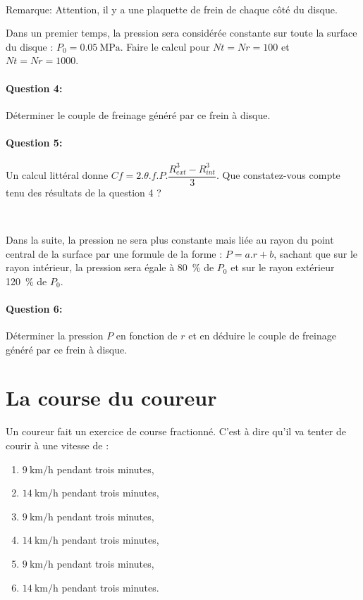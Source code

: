 ~\

Remarque: Attention, il y a une plaquette de frein de chaque côté du disque.

Dans un premier temps, la pression sera considérée constante sur toute la surface du disque : $P_0=\SI{0,05}{\mega\pascal}$. Faire le calcul pour $Nt=Nr=100$ et $Nt=Nr=1000$.

\paragraph{Question 4:} Déterminer le couple de freinage généré par ce frein à disque.

\paragraph{Question 5:} Un calcul littéral donne $Cf=2.\theta.f.P.\dfrac{R_{ext}^3-R_{int}^3}{3}$. Que constatez-vous compte tenu des résultats de la question 4 ?

~\

Dans la suite, la pression ne sera plus constante mais liée au rayon du point central de la surface par une formule de la forme : $P=a.r+b$, sachant que sur le rayon intérieur, la pression sera égale à \SI{80}{\percent} de $P_0$ et sur le rayon extérieur \SI{120}{\percent} de $P_0$.

\paragraph{Question 6:} Déterminer la pression $P$ en fonction de $r$ et en déduire le couple de freinage généré par ce frein à disque.

\section{La course du coureur}

Un coureur fait un exercice de course fractionné. C'est à dire qu'il va tenter de courir à une vitesse de :
\begin{enumerate}
 \item $\SI{9}{\kilo\meter\per\hour}$ pendant trois minutes,
 \item $\SI{14}{\kilo\meter\per\hour}$ pendant trois minutes,
 \item $\SI{9}{\kilo\meter\per\hour}$ pendant trois minutes,
 \item $\SI{14}{\kilo\meter\per\hour}$ pendant trois minutes,
 \item $\SI{9}{\kilo\meter\per\hour}$ pendant trois minutes,
 \item $\SI{14}{\kilo\meter\per\hour}$ pendant trois minutes.
\end{enumerate}

